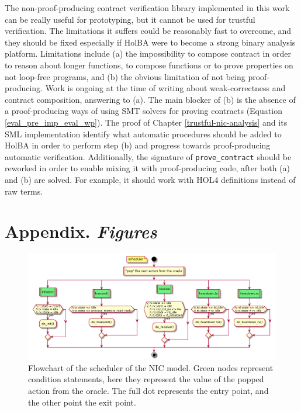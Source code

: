 \documentclass[10pt,a4paper]{article}
\begin{document}
\begin{multicols}{2}
The non-proof-producing contract verification library implemented in this work can be really useful for prototyping, but it cannot be used for trustful verification. The limitations it suffers could be reasonably fast to overcome, and they should be fixed especially if HolBA were to become a strong binary analysis platform. Limitations include (a) the impossibility to compose contract in order to reason about longer functions, to compose functions or to prove properties on not loop-free programs, and (b) the obvious limitation of not being proof-producing. Work is ongoing at the time of writing about weak-correctness and contract composition, answering to (a). The main blocker of (b) is the absence of a proof-producing ways of using SMT solvers for proving contracts (Equation \ref{eval_pre_imp_eval_wp}). The proof of Chapter \ref{trustful-nic-analysis} and its SML implementation identify what automatic procedures should be added to HolBA in order to perform step (b) and progress towards proof-producing automatic verification. Additionally, the signature of \texttt{prove\_contract} should be reworked in order to enable mixing it with proof-producing code, after both (a) and (b) are solved. For example, it should work with HOL4 definitions instead of raw terms.


\end{multicols}

\renewcommand*{\bibfont}{\footnotesize}
\printbibliography

\newpage
\section*{Appendix. {\normalsize\textit{Figures}}}
\renewcommand{\thefigure}{A.\arabic{figure}}
\setcounter{figure}{0}

\begin{figure}[htbp]
	\includegraphics[width=\columnwidth]{figures/flowchart-scheduler.png}
	\centering
	\caption{Flowchart of the scheduler of the NIC model. Green nodes represent condition statements, here they represent the value of the popped action from the oracle. The full dot represents the entry point, and the other point the exit point.}
	\label{flowchart-scheduler}
\end{figure}
\end{document}
